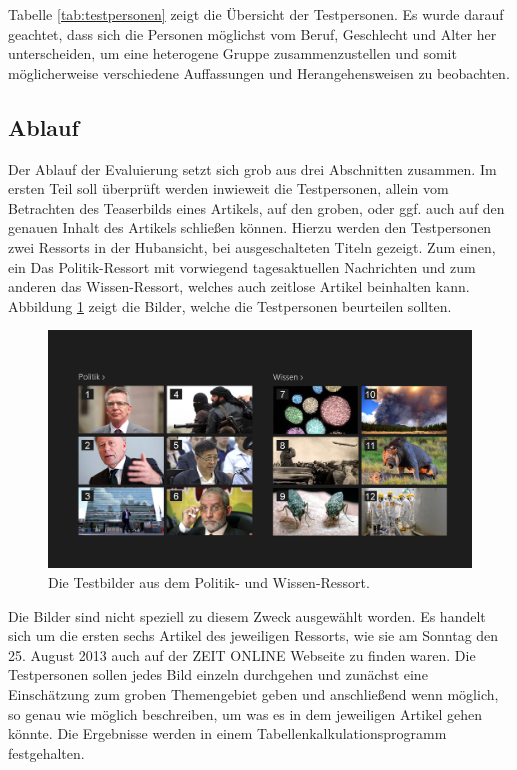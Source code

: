 \documentclass[12pt,a4paper,bibtotoc,abstracton]{scrartcl}
\begin{document}
Tabelle \ref{tab:testpersonen} zeigt die Übersicht der Testpersonen. Es wurde darauf geachtet, dass sich die Personen möglichst vom Beruf, Geschlecht und Alter her unterscheiden, um eine heterogene Gruppe zusammenzustellen und somit möglicherweise verschiedene Auffassungen und Herangehensweisen zu beobachten.


\subsection{Ablauf}
\label{subsec:ablauf}
Der Ablauf der Evaluierung setzt sich grob aus drei Abschnitten zusammen. Im ersten Teil soll überprüft werden inwieweit die Testpersonen, allein vom Betrachten des Teaserbilds eines Artikels, auf den groben, oder ggf. auch auf den genauen Inhalt des Artikels schließen können. Hierzu werden den Testpersonen zwei Ressorts in der Hubansicht, bei ausgeschalteten Titeln gezeigt. Zum einen, ein Das Politik-Ressort mit vorwiegend tagesaktuellen Nachrichten und zum anderen das Wissen-Ressort, welches auch zeitlose Artikel beinhalten kann. Abbildung \ref{fig:testbilder} zeigt die Bilder, welche die Testpersonen beurteilen sollten.

\begin{figure}[h]
	\centering
	\includegraphics[width=\textwidth]{Evaluierung/Testbilder/collage_politik_wissen_numbers.png} 
	\caption{Die Testbilder aus dem Politik- und Wissen-Ressort.}
	\label{fig:testbilder}
\end{figure}  

Die Bilder sind nicht speziell zu diesem Zweck ausgewählt worden. Es handelt sich um die ersten sechs Artikel des jeweiligen Ressorts, wie sie am Sonntag den 25. August 2013 auch auf der ZEIT ONLINE Webseite zu finden waren. Die Testpersonen sollen jedes Bild einzeln durchgehen und zunächst eine Einschätzung zum groben Themengebiet geben und anschließend wenn möglich, so genau wie möglich beschreiben, um was es in dem jeweiligen Artikel gehen könnte. Die Ergebnisse werden in einem Tabellenkalkulationsprogramm festgehalten.\\
\end{document}
